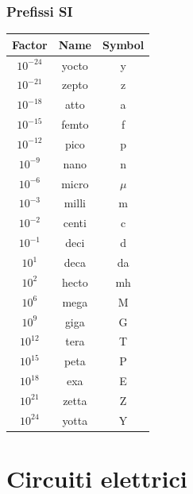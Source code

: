\documentclass{article}
\begin{document}
\subsubsection{Prefissi SI}
\begin{center}
    \renewcommand{\arraystretch}{1.5}
    \begin{tabular}{|c|c|c|}
        \hline
        Factor & Name & Symbol\\
        \hline 
        $10^{-24}$ & yocto  & y\\
        \hline 
        $10^{-21}$ & zepto & z\\
        \hline 
        $10^{-18}$ & atto & a\\
        \hline 
        $10^{-15}$ & femto & f\\
        \hline 
        $10^{-12}$ & pico & p\\
        \hline 
        $10^{-9}$ & nano & n\\
        \hline 
        $10^{-6}$ & micro & $\mu$\\
        \hline 
        $10^{-3}$ & milli & m\\
        \hline 
        $10^{-2}$ & centi & c\\
        \hline 
        $10^{-1}$ & deci & d\\
        \hline 
        $10^{1}$ & deca & da\\
        \hline 
        $10^{2}$ & hecto & mh\\
        \hline 
        $10^{6}$ & mega & M\\
        \hline 
        $10^{9}$ & giga & G\\
        \hline 
        $10^{12}$ & tera & T\\
        \hline 
        $10^{15}$ & peta & P\\
        \hline 
        $10^{18}$ & exa & E\\
        \hline 
        $10^{21}$ & zetta & Z\\
        \hline 
        $10^{24}$ & yotta & Y\\
        \hline 
    \end{tabular}
\end{center}






\section{Circuiti elettrici}
\end{document}
